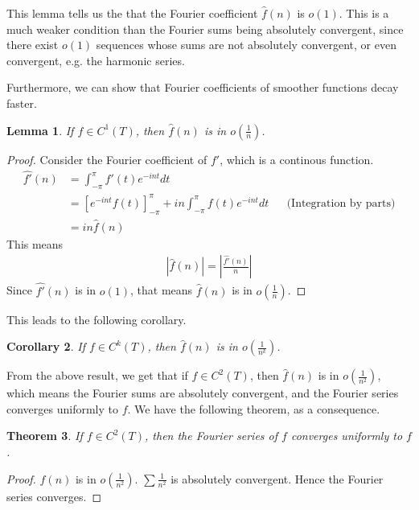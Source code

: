 \documentclass[12pt, titlepage]{article}
\newtheorem{thm}{Theorem}[section]
\newtheorem{lem}[thm]{Lemma}
\newtheorem{cor}[thm]{Corollary}
\theoremstyle{definition}
\begin{document}
This lemma tells us the that the Fourier coefficient $\widehat{f}(n)$ is $o(1)$. This is a much weaker condition than the Fourier sums being absolutely convergent, since there exist $o(1)$ sequences whose sums are not absolutely convergent, or even convergent, e.g. the harmonic series.

Furthermore, we can show that Fourier coefficients of smoother functions decay faster. 
\begin{lem}
    If $f \in C^1(T)$, then $\widehat{f}(n)$ is in $o\left( \frac{1}{n} \right)$.
\end{lem}

\begin{proof}
    Consider the Fourier coefficient of $f'$, which is a continous function.
    \begin{align*}
        \widehat{f'}(n) &= \int_{-\pi}^{\pi} f'(t) e^{-int} dt \\
        &= \left[e^{-int} f(t) \right]_{-\pi}^{\pi} + in \int_{-\pi}^{\pi} f(t) e^{-int} dt &&\text{(Integration by parts)} \\
        &= in\widehat{f}(n)
    \end{align*}
    This means 
    \begin{align*}
        \left| \widehat{f}(n) \right| = \left| \frac{\widehat{f'}(n)}{n} \right|
    \end{align*}
    Since $\widehat{f'}(n)$ is in $o(1)$, that means $\widehat{f}(n)$ is in $o\left( \frac{1}{n} \right)$.
\end{proof}
This leads to the following corollary.

\begin{cor}
    If $f \in C^k(T)$, then $\widehat{f}(n)$ is in $o \left( \frac{1}{n^k} \right)$.
\end{cor}

From the above result, we get that if $f \in C^2(T)$, then $\widehat{f}(n)$ is in $o\left( \frac{1}{n^2} \right)$, which means the Fourier sums are absolutely convergent, and the Fourier series converges uniformly to $f$. We have the following theorem, as a consequence.

\begin{thm}
    If $f \in C^2(T)$, then the Fourier series of $f$ converges uniformly to $f$.
\end{thm}

\begin{proof}
    $\widehat{f}(n)$ is in $o \left( \frac{1}{n^2} \right)$. $\sum \frac{1}{n^2}$ is absolutely convergent. Hence the Fourier series converges. 
\end{proof}
\end{document}

